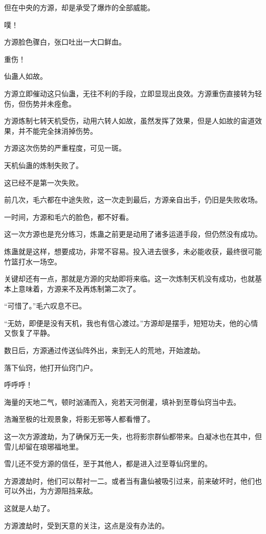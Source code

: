 \begin{this_body}
但在中央的方源，却是承受了爆炸的全部威能。

噗！

方源脸色骤白，张口吐出一大口鲜血。

重伤！

仙蛊人如故。

方源立即催动这只仙蛊，无往不利的手段，立即显现出良效。方源重伤直接转为轻伤，但伤势并未痊愈。

方源炼制七转天机受伤，动用六转人如故，虽然发挥了效果，但是人如故的宙道效果，并不能完全抹消掉伤势。

方源这次伤势的严重程度，可见一斑。

天机仙蛊的炼制失败了。

这已经不是第一次失败。

前几次，毛六都在中途失败，这一次走到最后，方源亲自出手，仍旧是失败收场。

一时间，方源和毛六的脸色，都不好看。

这一次方源也是充分练习，炼蛊之前更是动用了诸多运道手段，但仍然没有成功。

炼蛊就是这样，想要成功，非常不容易。投入进去很多，未必能收获，最终很可能竹篮打水一场空。

关键却还有一点，那就是方源的灾劫即将来临。这一次炼制天机没有成功，也就基本上意味着，方源来不及再炼制第二次了。

“可惜了。”毛六叹息不已。

“无妨，即便是没有天机，我也有信心渡过。”方源却是摆手，短短功夫，他的心情又恢复了平静。

数日后，方源通过传送仙阵外出，来到无人的荒地，开始渡劫。

落下仙窍，他打开仙窍门户。

呼呼呼！

海量的天地二气，顿时汹涌而入，宛若天河倒灌，填补到至尊仙窍当中去。

浩瀚至极的壮观景象，将影无邪等人都看懵了。

这一次方源渡劫，为了确保万无一失，也将影宗群仙都带来。白凝冰也在其中，但雪儿却留在琅琊福地里。

雪儿还不受方源的信任，至于其他人，都是进入过至尊仙窍里的。

方源渡劫时，他们可以帮衬一二。或者当有蛊仙被吸引过来，前来破坏时，他们也可以外出，为方源阻挡来敌。

这就是人劫了。

方源渡劫时，受到天意的关注，这点是没有办法的。


\end{this_body}
